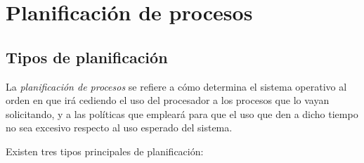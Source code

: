 \documentclass[11pt,fleqn]{book} %
\begin{document}
\chapter{Planificación de procesos}
\label{sec-4}
\section{Tipos de planificación}
\label{sec-4-1}
\label{PLAN}


La \emph{planificación de procesos} se refiere a cómo determina el sistema
operativo al orden en que irá cediendo el uso del procesador a los
procesos que lo vayan solicitando, y a las políticas que empleará
para que el uso que den a dicho tiempo no sea excesivo respecto al
uso esperado del sistema.

Existen tres tipos principales de planificación:
\end{document}
